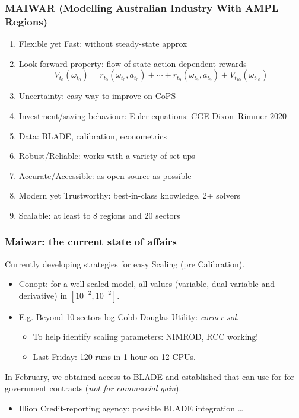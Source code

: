 \documentclass[handout,english]{beamer}
\begin{document}
\begin{frame}
  \frametitle{MAIWAR \small(Modelling Australian Industry With AMPL Regions)}
  \begin{enumerate}\footnotesize
    \item Flexible yet Fast: without steady-state approx
    \item Look-forward property: flow of state-action dependent rewards
  \[
    V_{t_0}(\omega_{t_0}) = r_{t_0}(\omega_{t_0}, a_{t_0}) + \cdots
    + r_{t_9}(\omega_{t_9}, a_{t_9}) + V_{t_{10}}(\omega_{t_{10}})
  \]
    \item Uncertainty: easy way to improve on CoPS
    \item Investment/saving behaviour: Euler equations: CGE Dixon--Rimmer 2020
    \item Data: BLADE, calibration, econometrics
    \item Robust/Reliable: works with a variety of set-ups
    \item Accurate/Accessible: as open source as possible
    \item Modern yet Trustworthy: best-in-class knowledge, 2+ solvers
    \item Scalable: at least to 8 regions and 20 sectors
  \end{enumerate}\normalsize
\end{frame}
\begin{frame}
  \frametitle{Maiwar: the current state of affairs}\thispagestyle{empty}
  Currently developing strategies for easy Scaling (pre Calibration).
    \begin{itemize}
      \item Conopt: for a well-scaled model, all values (variable,
        dual variable and derivative) in $[10^{-2} , 10^{+2}]$.
      \item E.g. Beyond 10 sectors log Cobb-Douglas Utility:
        \emph{corner sol}.
        \begin{itemize}
          \item To help identify scaling parameters: NIMROD, RCC working!
          \item Last Friday: 120 runs in 1 hour on 12 CPUs.
        \end{itemize}
    \end{itemize}

  In February, we obtained access to BLADE and established that can use for
  for government contracts (\emph{not for commercial gain}).
  \begin{itemize}
    \item Illion Credit-reporting agency: possible BLADE integration \dots
  \end{itemize}
\end{frame}
\end{document}
